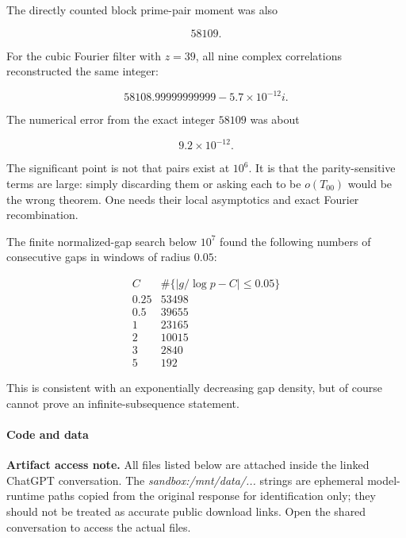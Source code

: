 The directly counted block prime-pair moment was also

\[
58109.
\]

For the cubic Fourier filter with \(z=39\), all nine complex correlations reconstructed the same integer:

\[
58108.99999999999-5.7\times10^{-12}i.
\]

The numerical error from the exact integer \(58109\) was about

\[
9.2\times10^{-12}.
\]

The significant point is not that pairs exist at \(10^6\). It is that the parity-sensitive terms are large: simply discarding them or asking each to be \(o(T_{00})\) would be the wrong theorem. One needs their local asymptotics and exact Fourier recombination.

The finite normalized-gap search below \(10^7\) found the following numbers of consecutive gaps in windows of radius \(0.05\):

\[
\begin{array}{c|r}
C&\#\{|g/\log p-C|\le0.05\}\\ \hline
0.25&53498\\
0.5&39655\\
1&23165\\
2&10015\\
3&2840\\
5&192
\end{array}
\]

This is consistent with an exponentially decreasing gap density, but of course cannot prove an infinite-subsequence statement.

\paragraph{Code and data}

\noindent\textbf{Artifact access note.}
All files listed below are attached inside the linked ChatGPT conversation. The \emph{sandbox:/mnt/data/...} strings are ephemeral model-runtime paths copied from the original response for identification only; they should not be treated as accurate public download links. Open the shared conversation to access the actual files.

